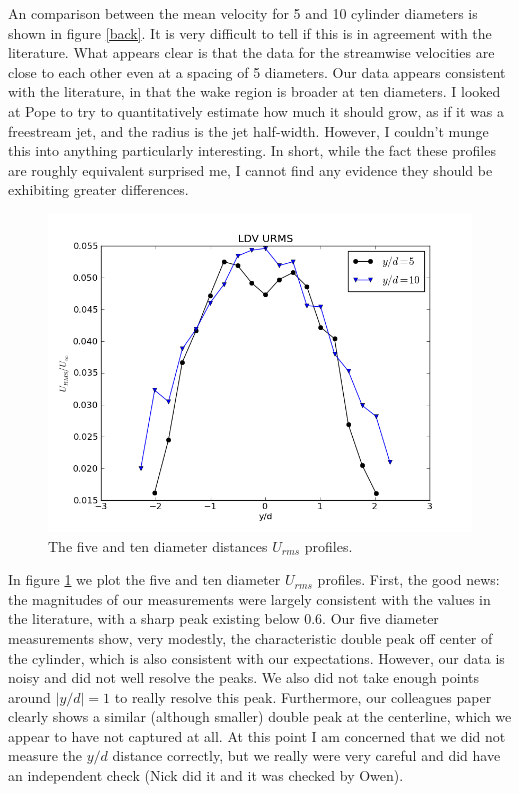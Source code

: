 \documentclass{article}
\begin{document}
An comparison between the mean velocity for 5 and 10 cylinder diameters
is shown in figure \ref{back}. It is very difficult to tell if this
is in agreement with the literature. What appears clear is that the data
for the streamwise velocities are close to each other even at a spacing
of 5 diameters. Our data appears consistent with the literature, in that
the wake region is broader at ten diameters. I looked at Pope to try to
quantitatively estimate how much it should grow, as if it was a
freestream jet, and the radius is the jet half-width. However, I
couldn't munge this into anything particularly interesting. In short,
while the fact these profiles are roughly equivalent surprised me, I
cannot find any evidence they should be exhibiting greater differences. 

\begin{figure}[!htb]
 \begin{center}
  \includegraphics[width = 12 cm]{figs/urms}
  \caption{The five and ten diameter distances $U_{rms}$ profiles. }
  \label{urms}
 \end{center}
\end{figure}

In figure \ref{urms} we plot the five and ten diameter $U_{rms}$
profiles. First, the good news: the magnitudes of our measurements were
largely consistent with the values in the literature, with a sharp peak
existing below 0.6. Our five diameter measurements show, very modestly,
the characteristic double peak off center of the cylinder, which is also
consistent with our expectations. However, our data is noisy and did not
well resolve the peaks. We also did not take enough points around $|y/d|
=1$ to really resolve this peak. Furthermore, our colleagues paper
clearly shows a similar (although smaller) double peak at the
centerline, which we appear to have not captured at all. At this point I
am concerned that we did not measure the $y/d$ distance correctly, but
we really were very careful and did have an independent check (Nick did
it and it was checked by Owen). 
\end{document}
